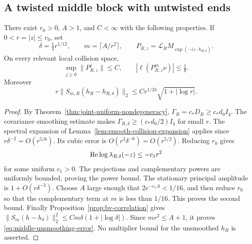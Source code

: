 \subsection{A twisted middle block with untwisted ends}
\begin{lemma}
\label{lem:diffusive-middle-damping}
There exist $r_0>0$, $A>1$, and $C<\infty$ with the following
properties. If $0<r=|z|\le r_0$, set
\[
 \delta=\tfrac14r^{1/12},\qquad m=\lceil A/r^2\rceil,\qquad
 P_{R,z}=\mathcal L_R M_{\exp(-iz\cdot h_{R,\delta})}.
\]
On every relevant local collision space,
\begin{equation}\label{eq:diffusive-middle-damping}
 \sup_{j\ge0}\|P_{R,z}^{j}\|\le C,
       \qquad |\ell(P_{R,z}^{m}\nu)|\le\tfrac18.
\end{equation}
Moreover
\begin{equation}\label{eq:middle-unsmoothing-error}
 r\|S_{m,R}(h_R-h_{R,\delta})\|_2
       \le C r^{1/24}\sqrt{1+|\log r|}.
\end{equation}
\end{lemma}
\begin{proof}
By Theorem~\ref{thm:joint-uniform-nondegeneracy},
$\Gamma_R=c_*D_R\ge c_*d_0I_4$. The covariance smoothing estimate
makes $\Gamma_{R,\delta}\ge(c_*d_0/2)I_4$ for small $r$.
The spectral expansion of Lemma~\ref{lem:smooth-collision-expansion}
applies since $r\delta^{-2}=O(r^{5/6})$. Its cubic error is
$O(r^3\delta^{-6})=O(r^{5/2})$. Reducing $r_0$ gives
\[
 \mathop{\rm Re}\log\lambda_{R,\delta}(-z)\le-c_1r^2
\]
for some uniform $c_1>0$. The projections and complementary powers
are uniformly bounded, proving the power bound. The stationary
principal amplitude is $1+O(r\delta^{-2})$. Choose $A$ large enough
that $2e^{-c_1A}<1/16$, and then reduce $r_0$ so that the
complementary term at $m$ is less than $1/16$. This proves the
second bound. Finally Proposition~\ref{prop:bv-correlation} gives
$\|S_m(h-h_\delta)\|_2^2\le Cm\delta(1+|\log\delta|)$.
Since $mr^2\le A+1$, it proves
\eqref{eq:middle-unsmoothing-error}. No multiplier bound for the
unsmoothed $h_R$ is asserted.
\end{proof}

